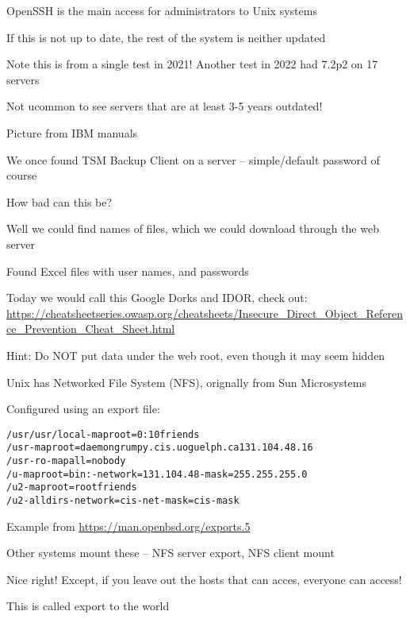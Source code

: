 \documentclass[Screen16to9,17pt]{foils}
\begin{document}


\begin{list2}
\item OpenSSH is the main access for administrators to Unix systems
\item If this is not up to date, the rest of the system is neither updated
\item Note this is from a single test in 2021! Another test in 2022 had 7.2p2 on 17 servers
\item Not ucommon to see servers that are at least 3-5 years outdated!
\end{list2}



Picture from IBM manuals

\begin{list2}
\item We once found TSM Backup Client on a server -- simple/default password of course
\item How bad can this be?
\item Well we could find names of files, which we could download through the web server
\item Found Excel files with user names, and passwords
\item Today we would call this Google Dorks and IDOR, check out:\\ {\footnotesize
\url{https://cheatsheetseries.owasp.org/cheatsheets/Insecure_Direct_Object_Reference_Prevention_Cheat_Sheet.html}}
\end{list2}

Hint: Do NOT put data under the web root, even though it may seem hidden


Unix has Networked File System (NFS), orignally from Sun Microsystems

Configured using an export file:
\begin{alltt}\footnotesize
/usr /usr/local -maproot=0:10 friends
/usr -maproot=daemon grumpy.cis.uoguelph.ca 131.104.48.16
/usr -ro -mapall=nobody
/u -maproot=bin: -network=131.104.48 -mask=255.255.255.0
/u2 -maproot=root friends
/u2 -alldirs -network=cis-net -mask=cis-mask
\end{alltt}
Example from \url{https://man.openbsd.org/exports.5}

\begin{list2}
\item Other systems mount these -- NFS server export, NFS client mount
\item Nice right! Except, if you leave out the hosts that can acces, everyone can access!
\item This is called export to the world
\end{list2}
\end{document}
